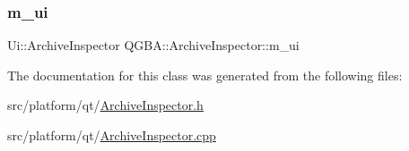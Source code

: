 \subsubsection{\texorpdfstring{m\+\_\+ui}{m\_ui}}
{\footnotesize\ttfamily Ui\+::\+Archive\+Inspector Q\+G\+B\+A\+::\+Archive\+Inspector\+::m\+\_\+ui\hspace{0.3cm}{\ttfamily [private]}}



The documentation for this class was generated from the following files\+:\begin{DoxyCompactItemize}
\item 
src/platform/qt/\mbox{\hyperlink{_archive_inspector_8h}{Archive\+Inspector.\+h}}\item 
src/platform/qt/\mbox{\hyperlink{_archive_inspector_8cpp}{Archive\+Inspector.\+cpp}}\end{DoxyCompactItemize}
